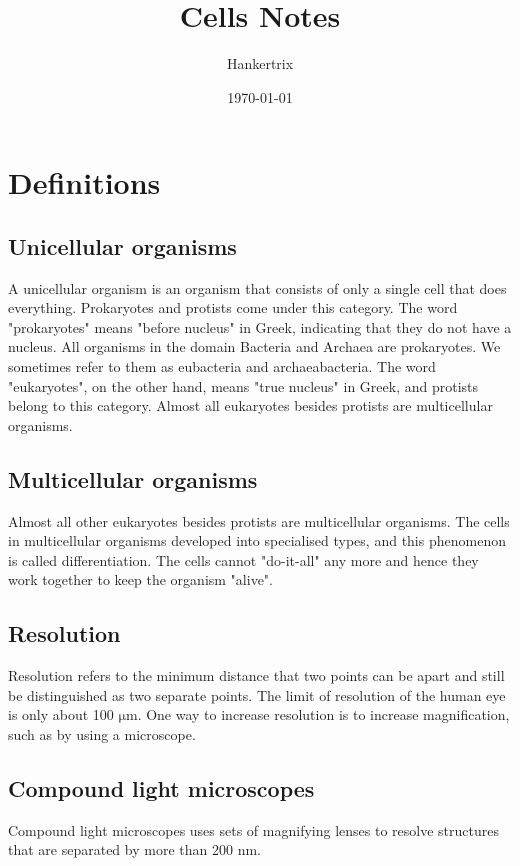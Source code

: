 \documentclass[11pt]{article}
\author{Hankertrix}
\date{\today}
\title{Cells Notes}
\begin{document}
\maketitle
\setcounter{tocdepth}{2}
\tableofcontents \clearpage\newpage
\section{Definitions}
\label{sec:org60a2f0b}

\subsection{Unicellular organisms}
\label{sec:org1d8d371}
A unicellular organism is an organism that consists of only a single cell that does everything. Prokaryotes and protists come under this category. The word "prokaryotes" means "before nucleus" in Greek, indicating that they do not have a nucleus. All organisms in the domain Bacteria and Archaea are prokaryotes. We sometimes refer to them as eubacteria and archaeabacteria. The word "eukaryotes", on the other hand, means "true nucleus" in Greek, and protists belong to this category. Almost all eukaryotes besides protists are multicellular organisms.
\subsection{Multicellular organisms}
\label{sec:org886b7a4}
Almost all other eukaryotes besides protists are multicellular organisms. The cells in multicellular organisms developed into specialised types, and this phenomenon is called differentiation. The cells cannot "do-it-all" any more and hence they work together to keep the organism "alive".
\subsection{Resolution}
\label{sec:org1152008}
Resolution refers to the minimum distance that two points can be apart and still be distinguished as two separate points. The limit of resolution of the human eye is only about 100 \(\unit{\micro\metre}\). One way to increase resolution is to increase magnification, such as by using a microscope.
\subsection{Compound light microscopes}
\label{sec:org3287888}
Compound light microscopes uses sets of magnifying lenses to resolve structures that are separated by more than 200 \(\unit{\nano\metre}\).
\end{document}

